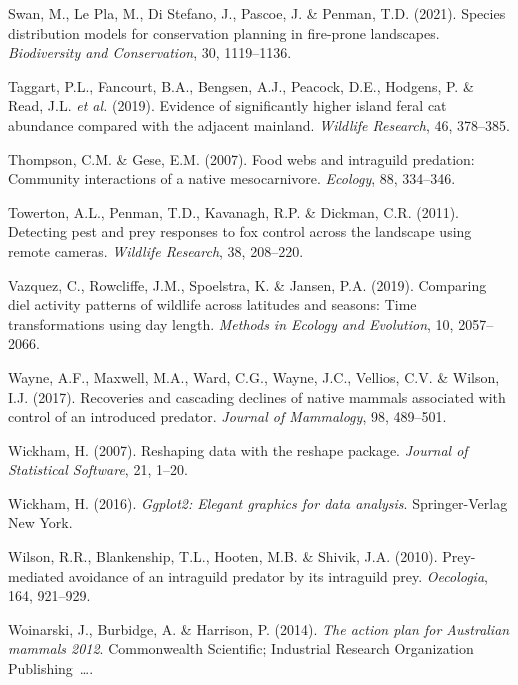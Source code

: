 \documentclass[11pt,a4paper,titlepage,twoside,openright]{style/unimelbthesis}
\begin{document}
\begin{mainmatter}
\leavevmode\hypertarget{ref-swan2021species}{}%
Swan, M., Le Pla, M., Di Stefano, J., Pascoe, J. \& Penman, T.D. (2021). Species distribution models for conservation planning in fire-prone landscapes. \emph{Biodiversity and Conservation}, 30, 1119--1136.

\leavevmode\hypertarget{ref-taggart2019evidence}{}%
Taggart, P.L., Fancourt, B.A., Bengsen, A.J., Peacock, D.E., Hodgens, P. \& Read, J.L. \emph{et al.} (2019). Evidence of significantly higher island feral cat abundance compared with the adjacent mainland. \emph{Wildlife Research}, 46, 378--385.

\leavevmode\hypertarget{ref-thompson2007food}{}%
Thompson, C.M. \& Gese, E.M. (2007). Food webs and intraguild predation: Community interactions of a native mesocarnivore. \emph{Ecology}, 88, 334--346.

\leavevmode\hypertarget{ref-towerton2011detecting}{}%
Towerton, A.L., Penman, T.D., Kavanagh, R.P. \& Dickman, C.R. (2011). Detecting pest and prey responses to fox control across the landscape using remote cameras. \emph{Wildlife Research}, 38, 208--220.

\leavevmode\hypertarget{ref-vazquez2019comparing}{}%
Vazquez, C., Rowcliffe, J.M., Spoelstra, K. \& Jansen, P.A. (2019). Comparing diel activity patterns of wildlife across latitudes and seasons: Time transformations using day length. \emph{Methods in Ecology and Evolution}, 10, 2057--2066.

\leavevmode\hypertarget{ref-wayne2017recoveries}{}%
Wayne, A.F., Maxwell, M.A., Ward, C.G., Wayne, J.C., Vellios, C.V. \& Wilson, I.J. (2017). Recoveries and cascading declines of native mammals associated with control of an introduced predator. \emph{Journal of Mammalogy}, 98, 489--501.

\leavevmode\hypertarget{ref-reshape}{}%
Wickham, H. (2007). Reshaping data with the reshape package. \emph{Journal of Statistical Software}, 21, 1--20.

\leavevmode\hypertarget{ref-ggplot2}{}%
Wickham, H. (2016). \emph{Ggplot2: Elegant graphics for data analysis}. Springer-Verlag New York.

\leavevmode\hypertarget{ref-wilson2010prey}{}%
Wilson, R.R., Blankenship, T.L., Hooten, M.B. \& Shivik, J.A. (2010). Prey-mediated avoidance of an intraguild predator by its intraguild prey. \emph{Oecologia}, 164, 921--929.

\leavevmode\hypertarget{ref-woinarski2014action}{}%
Woinarski, J., Burbidge, A. \& Harrison, P. (2014). \emph{The action plan for Australian mammals 2012}. Commonwealth Scientific; Industrial Research Organization Publishing~\ldots.


\end{mainmatter}
\end{document}
